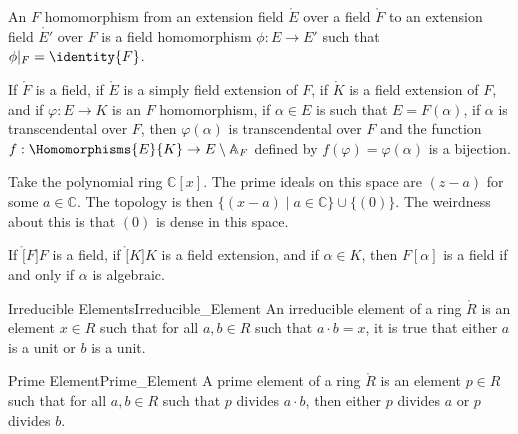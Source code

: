 \documentclass{article}                                                        %
\begin{document}
        \begin{definition}
            An $F$ homomorphism from an extension field $\ring{E}$ over a field
            $\ring{F}$ to an extension field $\ring{E'}$  over $F$ is a field
            homomorphism $\phi:E\rightarrow{E}'$ such that
            $\phi|_{F}=\identity{F}$.
        \end{definition}
        \begin{theorem}
            If $\ring{F}$ is a field, if $\ring{E}$ is a simply field extension
            of $F$, if $\ring{K}$ is a field extension of $F$, and if
            $\varphi:E\rightarrow{K}$ is an $F$ homomorphism, if $\alpha\in{E}$
            is such that $E=F(\alpha)$, if $\alpha$ is transcendental over $F$,
            then $\varphi(\alpha)$ is transcendental over $F$ and the function
            $f:\Homomorphisms{E}{K}\rightarrow{E}\setminus\mathbb{A}_{F}$
            defined by $f(\varphi)=\varphi(\alpha)$ is a bijection.
        \end{theorem}
        \begin{example}
            Take the polynomial ring $\mathbb{C}[x]$. The prime ideals on this
            space are $(z-a)$ for some $a\in\mathbb{C}$. The topology is then
            $\{(x-a)\;|\;a\in\mathbb{C}\}\cup\{(0)\}$. The weirdness about this
            is that $(0)$ is dense in this space.
        \end{example}
        \begin{theorem}
            If $\ring[F]{F}$ is a field, if $\ring[K]{K}$ is a field extension,
            and if $\alpha\in{K}$, then $F[\alpha]$ is a field if and only if
            $\alpha$ is algebraic. 
        \end{theorem}
        \begin{theorem}
        \end{theorem}
        \begin{fdefinition}{Irreducible Elements}{Irreducible_Element}
            An irreducible element of a ring $\ring{R}$ is an element
            $x\in{R}$ such that for all $a,b\in{R}$ such that $a\cdot{b}=x$, it
            is true that either $a$ is a unit or $b$ is a unit.
        \end{fdefinition}
        \begin{fdefinition}{Prime Element}{Prime_Element}
            A prime element of a ring $\ring{R}$ is an element $p\in{R}$
            such that for all $a,b\in{R}$ such that $p$ divides $a\cdot{b}$,
            then either $p$ divides $a$ or $p$ divides $b$.
        \end{fdefinition}
\end{document}
